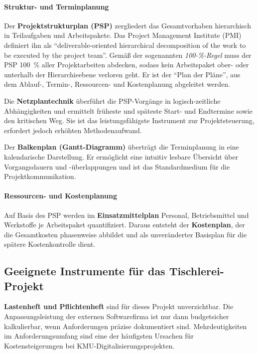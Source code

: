 \documentclass[
    a4paper,
    11pt,
    bibliography=totoc,
    listof=totoc,
    parskip=half,
    headings=normal
]{scrbook}
\begin{document}
\paragraph{Struktur- und Terminplanung}
Der \textbf{Projektstrukturplan (PSP)} zergliedert das Gesamtvorhaben hierarchisch
in Teilaufgaben und Arbeitspakete. Das Project Management Institute (PMI) definiert
ihn als \enquote{deliverable-oriented hierarchical decomposition of the work to be
      executed by the project team}\autocite[PMI, 2006, zit. n.][]{PMI2021}. Gemäß der
sogenannten \textit{100-\%-Regel} muss der PSP 100~\% aller Projektarbeiten
abdecken, sodass kein Arbeitspaket ober- oder unterhalb der Hierarchieebene verloren
geht\autocite[vgl.][]{PMI_WBS2006}. Er ist der \enquote{Plan der Pläne}, aus dem
Ablauf-, Termin-, Ressourcen- und Kostenplanung abgeleitet werden\autocite[vgl.][Kap.~2]{Mayer2014}.

Die \textbf{Netzplantechnik} überführt die PSP-Vorgänge in logisch-zeitliche
Abhängigkeiten und ermittelt früheste und späteste Start- und Endtermine sowie den
kritischen Weg. Sie ist das leistungsfähigste Instrument zur Projektsteuerung\autocite[vgl.][Kap.~2]{Mayer2014}, erfordert jedoch erhöhten Methodenaufwand.

Der \textbf{Balkenplan (Gantt-Diagramm)} überträgt die Terminplanung in eine
kalendarische Darstellung. Er ermöglicht eine intuitiv lesbare Übersicht über
Vorgangsdauern und -überlappungen und ist das Standardmedium für die
Projektkommunikation.

\paragraph{Ressourcen- und Kostenplanung}
Auf Basis des PSP werden im \textbf{Einsatzmittelplan} Personal, Betriebsmittel
und Werkstoffe je Arbeitspaket quantifiziert. Daraus entsteht der
\textbf{Kostenplan}, der die Gesamtkosten phasenweise abbildet und als
unveränderter Basisplan für die spätere Kostenkontrolle dient\autocite[vgl.][Kap.~2]{Mayer2014}.

\subsection{Geeignete Instrumente für das Tischlerei-Projekt}

\textbf{Lastenheft und Pflichtenheft} sind für dieses Projekt unverzichtbar. Die
Anpassungsleistung der externen Softwarefirma ist nur dann budgetsicher kalkulierbar,
wenn Anforderungen präzise dokumentiert sind. Mehrdeutigkeiten im Anforderungsumfang
sind eine der häufigsten Ursachen für Kostensteigerungen bei KMU-Digitalisierungsprojekten\autocite[vgl.][nach Gerberich Consulting AG]{MittelstandDigital2019}.
\end{document}
